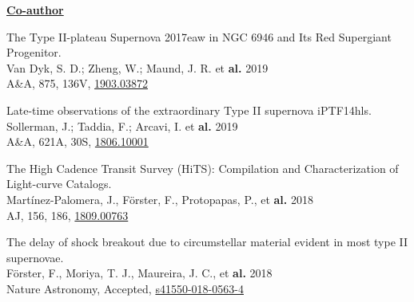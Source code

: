 \documentclass[12pt]{article}
\begin{document}
\vspace{0.8cm}
\underline{\textbf{Co-author}}
\vspace{0.2cm}
\begin{bibenum}

\item 
The Type II-plateau Supernova 2017eaw in NGC 6946 and Its Red Supergiant Progenitor.\\
Van Dyk, S. D.; Zheng, W.; Maund, J. R.  et \textbf{al.} 2019\\
A\&A, 875, 136V, \href{https://arxiv.org/abs/1903.03872}{1903.03872}

\item 
Late-time observations of the extraordinary Type II supernova iPTF14hls.\\
Sollerman, J.; Taddia, F.; Arcavi, I.  et \textbf{al.} 2019\\
A\&A, 621A, 30S, \href{https://arxiv.org/abs/1806.10001}{1806.10001}

\item 
The High Cadence Transit Survey (HiTS): Compilation and Characterization of Light-curve Catalogs.\\
Mart\'inez-Palomera, J., F\"orster, F., Protopapas, P.,  et \textbf{al.} 2018\\
AJ, 156, 186, \href{https://arxiv.org/abs/1809.00763}{1809.00763}

\item 
The delay of shock breakout due to circumstellar material evident in most type II supernovae.\\
F\"orster, F., Moriya, T. J., Maureira, J. C.,  et \textbf{al.} 2018\\
Nature Astronomy, Accepted, \href{http://adsabs.harvard.edu/doi/10.1038/s41550-018-0563-4}{s41550-018-0563-4}


\end{bibenum}
\end{document}
